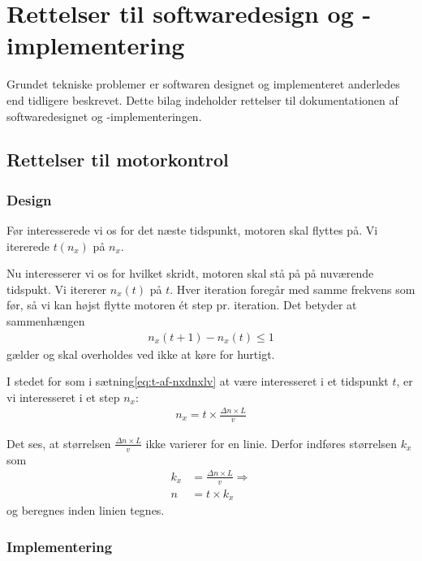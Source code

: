 \chapter{Rettelser til softwaredesign og -implementering}
\label{ch:bilag-rettelser-software}


Grundet tekniske problemer er softwaren designet og implementeret
anderledes end tidligere beskrevet. Dette bilag indeholder rettelser
til dokumentationen af softwaredesignet og -implementeringen.

\section{Rettelser til motorkontrol}

\subsection{Design}

Før interesserede vi os for det næste tidspunkt, motoren skal flyttes
på. Vi itererede $t(n_x)$ på $n_x$.

Nu interesserer vi os for hvilket skridt, motoren skal stå på på
nuværende tidspukt. Vi itererer $n_x(t)$ på $t$. Hver iteration
foregår med samme frekvens som før, så vi kan højst flytte motoren ét
step pr. iteration. Det betyder at sammenhængen
\begin{align}
  n_x(t+1) - n_x(t) \leq 1
\end{align}
gælder og skal overholdes ved ikke at køre for hurtigt.

I stedet for som i sætning\vref{eq:t-af-nxdnxlv} at være interesseret i et
tidspunkt $t$, er vi interesseret i et step $n_x$:
\begin{align}
  n_x = t \times \frac{\Delta n \times L}v
\end{align}

Det ses, at størrelsen $\frac{\Delta n \times L}v$ ikke varierer for
en linie. Derfor indføres størrelsen $k_x$ som
\begin{align}
  k_x &= \frac{\Delta n \times L}v \Rightarrow \\
  n &= t \times k_x
\end{align}
og beregnes inden linien tegnes.


\subsection{Implementering}

